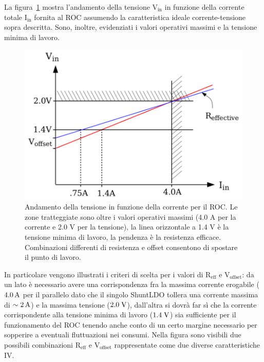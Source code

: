 La figura~\ref{VVC} mostra l'andamento della tensione $\mathrm{V_{in}}$ in funzione della corrente totale $\mathrm{I_{in}}$ fornita al ROC assumendo la caratteristica ideale corrente-tensione sopra descritta. Sono, inoltre, evidenziati i valori operativi massimi e la tensione minima di lavoro.
\begin{figure}[!htbp]
\centering
\includegraphics[scale=.3]{Immagini/VoltageVsCurrent}
\caption{Andamento della tensione in funzione della corrente per il ROC. Le zone tratteggiate sono oltre i valori operativi massimi (4.0 A per la corrente e 2.0 V per la tensione), la linea orizzontale a 1.4 V è la tensione minima di lavoro, la pendenza è la resistenza efficace. Combinazioni differenti di resistenza e offset consentono di spostare il punto di lavoro.}
\label{VVC}
\end{figure}
In particolare vengono illustrati i criteri di scelta per i valori di $\mathrm{R_{eff}}$ e $\mathrm{V_{offset}}$: da un lato \`e necessario avere una corrispondenza fra la massima corrente erogabile ($4.0\rm \, A$ per il parallelo dato che il singolo ShuntLDO tollera una corrente massima di $\sim2\rm \, A$) e la massima tensione ($2.0\rm \; V$), dall'altra si dovrà far s\`i che la corrente corrispondente alla tensione minima di lavoro ($1.4\rm \; V$) sia sufficiente per il funzionamento del ROC tenendo anche conto di un certo margine necessario per sopperire a eventuali fluttuazioni nei consumi. Nella figura sono visibili due possibili combinazioni $\mathrm{R_{eff}}$ e $\mathrm{V_{offset}}$ rappresentate come due diverse caratteristiche IV.

